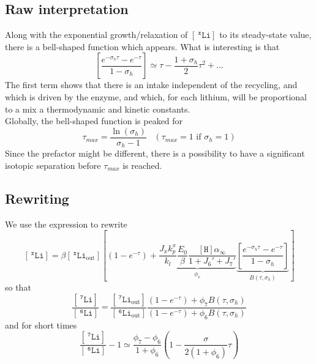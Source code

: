 \documentclass[aps,onecolumn,11pt]{revtex4}
\newcommand{\mychem}[1]{\mathtt{#1}}
\newcommand{\myconc}[1]{\left\lbrack{#1}\right\rbrack}
\newcommand{\spLi}[1]{{~^{\mychem{#1}}\mychem{Li}}}
\newcommand{\Li}[1]{\myconc{\spLi{#1}}}
\newcommand{\spLiOut}[1]{{\spLi{#1}}_{\mathrm{out}}}
\newcommand{\LiOut}[1]{\myconc{\spLiOut{#1}}}
\newcommand{\spproton}{\mychem{H}}
\newcommand{\proton}{\myconc{\spproton}}
\begin{document}
\subsection{Raw interpretation}
Along with the exponential growth/relaxation of $\Li{x}$ to its steady-state value, there is a bell-shaped function which appears.
What is interesting is that
\begin{equation}
	\left[
	 \dfrac{e^{-\sigma_h\tau} - e^{-\tau} }{1 - \sigma_h}\right] 
	 \simeq \tau - \dfrac{1+\sigma_h}{2} \tau^2 + \ldots
\end{equation}
The first term shows that there is an intake independent of the recycling, and which is driven by the enzyme, and which, for each lithium, will be proportional to a mix a thermodynamic and kinetic constants.\\
Globally, the bell-shaped function is peaked for
\begin{equation}
	\tau_{max} = \dfrac{\ln(\sigma_h)}{\sigma_h-1}\;\;\;(\tau_{max}=1 \text{ if } \sigma_h=1)
\end{equation}
Since the prefactor might be different, there is a possibility to have a significant isotopic separation before $\tau_{max}$ is reached.

\subsection{Rewriting}
We use the expression to rewrite
\begin{equation}
	\Li{x} =  \beta\LiOut{x}\left\lbrack  \left(1-e^{ -\tau }\right) + 
	\underbrace{
	\dfrac{J_x k_p^x}{k_l}
	\dfrac{E_0}{\beta}
	\dfrac{\proton \alpha_\infty}{1+J_6'+J_7'}
	}_{\phi_x}
	\underbrace{
	\left[
	 \dfrac{e^{-\sigma_h\tau} - e^{-\tau} }{1 - \sigma_h}\right]
	 }_{B\left(\tau,\sigma_h\right)}
	 \right\rbrack
\end{equation}
so that
\begin{equation}
	\dfrac{\Li{7} }{\Li{6}} = \dfrac{\LiOut{7} }{\LiOut{6}} 
	\dfrac{\left(1-e^{ -\tau }\right) + \phi_7 B\left(\tau,\sigma_h\right)}{\left(1-e^{ -\tau }\right) + \phi_6 B\left(\tau,\sigma_h\right) } 
\end{equation}
and for short times
\begin{equation}
	\dfrac{\Li{7} }{\Li{6}} - 1 \simeq \dfrac{\phi_7-\phi_6}{1+\phi_6} \left(1-\dfrac{\sigma}{2\left(1+\phi_6\right)}\tau\right)
\end{equation}
\end{document}
